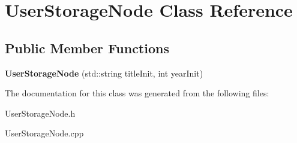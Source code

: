 \hypertarget{class_user_storage_node}{}\section{User\+Storage\+Node Class Reference}
\label{class_user_storage_node}
\subsection*{Public Member Functions}
\begin{DoxyCompactItemize}
\item 
\mbox{\label{class_user_storage_node_a1f61d11901801474b133fc264e0a6e28}} 
{\bfseries User\+Storage\+Node} (std\+::string title\+Init, int year\+Init)
\end{DoxyCompactItemize}


The documentation for this class was generated from the following files\+:\begin{DoxyCompactItemize}
\item 
User\+Storage\+Node.\+h\item 
User\+Storage\+Node.\+cpp\end{DoxyCompactItemize}
